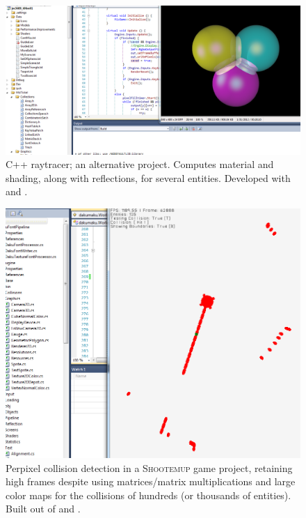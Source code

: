 \documentclass{LibHP20b}
\begin{document}
\begin{figure}
  \centering
  \includegraphics[height=0.4\textheight]{RasterizationsOfFun.png}
  \caption{C++ raytracer; an alternative project. Computes material and shading, along with reflections, for several entities. Developed with  and .}
  \label{fig:pixelsoffun}
\end{figure}

\begin{figure}
  \centering
  \includegraphics[height=0.4\textheight]{GameDevelopmentBarrelsOfFun.png}
  \caption{Perpixel collision detection in a \textsc{Shootemup} game project, retaining high frames despite using matrices/matrix multiplications and large color maps for the collisions of hundreds (or thousands of entities). Built out of  and .}
  \label{fig:gamesoffun}
\end{figure}
\end{document}
